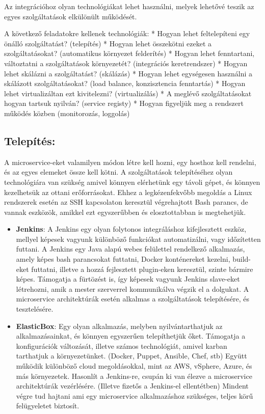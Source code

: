 \documentclass[11pt,magyar,a4paper,oneside,]{report}
\begin{document}
Az integrációhoz olyan technológiákat lehet használni, melyek lehetővé
teszik az egyes szolgáltatások elkülönült működését.

A következő feladatokre kellenek technológiák: * Hogyan lehet
feltelepíteni egy önálló szolgáltatást? (telepítés) * Hogyan lehet
összekötni ezeket a szolgáltatásokat? (automatikus környezet felderítés)
* Hogyan lehet fenntartani, változtatni a szolgáltatások környezetét?
(integrációs keretrendszer) * Hogyan lehet skálázni a szolgáltatást?
(skálázás) * Hogyan lehet egységesen használni a skálázott
szolgáltatásokat? (load balance, konzisztencia fenntartás) * Hogyan
lehet virtualizáltan ezt kivitelezni? (virtualizálás) * A meglévő
szolgáltatásokat hogyan tartsuk nyilván? (service registy) * Hogyan
figyeljük meg a rendszert működés közben (monitorozás, loggolás)

\subsection{Telepítés:}\label{telepuxedtuxe9s}

A microservice-eket valamilyen módon létre kell hozni, egy hosthoz kell
rendelni, és az egyes elemeket össze kell kötni. A szolgáltatások
telepítéséhez olyan technológiára van szükség amivel könnyen elérhetünk
egy távoli gépet, és könnyen kezelhetsük az ottani erőforrásokat. Ehhez
a legkézenfekvőbb megoldás a Linux rendszerek esetén az SSH kapcsolaton
keresztül végrehajtott Bash parancs, de vannak eszközök, amikkel ezt
egyszerűbben és elosztottabban is megtehetjük.

\begin{itemize}
\item
  \textbf{Jenkins}: A Jenkins egy olyan folytonos integráláshoz
  kifejlesztett eszköz, mellyel képesek vagyunk különböző funkciókat
  automatizálni, vagy időzítetten futtani. A Jenkins egy Java alapú
  webes felülettel rendelkező alkalmazás, amely képes bash parancsokat
  futtatni, Docker konténereket kezelni, build-eket futtatni, illetve a
  hozzá fejlesztett plugin-eken keresztül, szinte bármire képes.
  Támogatja a fürtözést is, így képesek vagyunk Jenkins slave-eket
  létrehozni, amik a mester szerverrel kommunikálva végzik el a
  dolgukat. A microservice architektúrák esetén alkalmas a
  szolgáltatások telepítésére, és tesztelésére.
\item
  \textbf{ElasticBox}: Egy olyan alkalmazás, melyben nyilvántarthatjuk
  az alkalmazásainkat, és könnyen egyszerűen telepíthetjük őket.
  Támogatja a konfigurációk változását, illetve számos technológiát,
  amivel karban tarthatjuk a környezetünket. (Docker, Puppet, Ansible,
  Chef, stb) Együtt működik különböző cloud megoldásokkal, mint az AWS,
  vSphere, Azure, és más környezetek. Hasonlít a Jenkins-re, csupán ki
  van élezve a microservice architektúrák vezérlésére. (Illetve fizetős
  a Jenkins-el ellentétben) Mindent végre tud hajtani ami egy
  microservice alkalmazáshoz szükséges, teljes körű felügyeletet
  biztosít.
\end{itemize}
\end{document}
